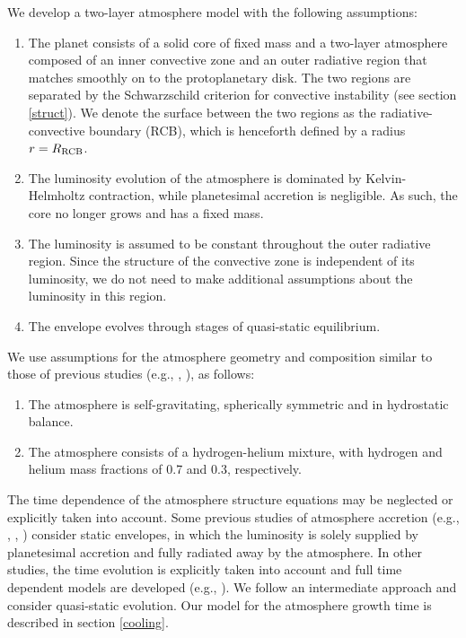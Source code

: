 \documentclass[apj]{emulateapj}
\newcommand{\cb}{_{\rm RCB}}
\begin{document}
We develop a two-layer atmosphere model with the following assumptions:

\begin{enumerate}
\item The planet consists of a solid core of fixed mass and a two-layer atmosphere composed of an inner convective zone and an outer radiative region that matches smoothly on to the protoplanetary disk. The two regions are separated by the Schwarzschild criterion for convective instability (see section \ref{struct}). We denote the surface between the two regions as the radiative-convective boundary (RCB), which is henceforth defined by a radius $r=R\cb$.
\item The luminosity evolution of the atmosphere is dominated by Kelvin-Helmholtz contraction, while planetesimal accretion is negligible. As such, the core no longer grows and has a fixed mass.
\item The luminosity is assumed to be constant throughout the outer radiative region. Since the structure of the convective zone is independent of its luminosity, we do not need to make additional assumptions about the luminosity in this region.
\item The envelope evolves through stages of quasi-static equilibrium.
\end{enumerate} 

We use assumptions for the atmosphere geometry and composition similar to those of previous studies (e.g., \citealt{ikoma00}, \citealt{pn05}), as follows:

\begin{enumerate}
\item The atmosphere is self-gravitating, spherically symmetric and in hydrostatic balance.
\item The atmosphere consists of a hydrogen-helium mixture, with hydrogen and helium mass fractions of 0.7 and 0.3, respectively.
\end{enumerate}

The time dependence of the atmosphere structure equations may be neglected or explicitly taken into account. Some previous studies of atmosphere accretion (e.g., \citealt{stevenson82}, \citealt{wuchterl93}, \citealt{rafikov06}) consider static envelopes, in which the luminosity is solely supplied by planetesimal accretion and fully radiated away by the atmosphere. In other studies, the time evolution is explicitly taken into account and full time dependent models are developed (e.g., \citealt{ikoma00}). We follow an intermediate approach and consider quasi-static evolution. Our model for the atmosphere growth time is described in section \ref{cooling}. 
\end{document}
